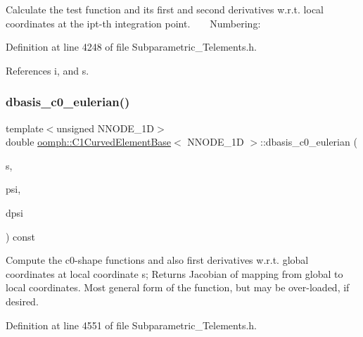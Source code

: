 Calculate the test function and its first and second derivatives w.\+r.\+t. local coordinates at the ipt-\/th integration point. ~\newline
~\newline
 Numbering\+: 

Definition at line 4248 of file Subparametric\+\_\+\+Telements.\+h.



References i, and s.

\mbox{\label{classoomph_1_1C1CurvedElementBase_a48932300808586ba1773a54a6ed768e4}} 
\subsubsection{\texorpdfstring{dbasis\+\_\+c0\+\_\+eulerian()}{dbasis\_c0\_eulerian()}}
{\footnotesize\ttfamily template$<$unsigned N\+N\+O\+D\+E\+\_\+1D$>$ \\
double \hyperlink{classoomph_1_1C1CurvedElementBase}{oomph\+::\+C1\+Curved\+Element\+Base}$<$ N\+N\+O\+D\+E\+\_\+1D $>$\+::dbasis\+\_\+c0\+\_\+eulerian (\begin{DoxyParamCaption}\item[{const \hyperlink{classoomph_1_1Vector}{Vector}$<$ double $>$ \&}]{s,  }\item[{\hyperlink{classoomph_1_1Shape}{Shape} \&}]{psi,  }\item[{\hyperlink{classoomph_1_1DShape}{D\+Shape} \&}]{dpsi }\end{DoxyParamCaption}) const\hspace{0.3cm}{\ttfamily [inline]}}



Compute the c0-\/shape functions and also first derivatives w.\+r.\+t. global coordinates at local coordinate s; Returns Jacobian of mapping from global to local coordinates. Most general form of the function, but may be over-\/loaded, if desired. 



Definition at line 4551 of file Subparametric\+\_\+\+Telements.\+h.

\mbox{\label{classoomph_1_1C1CurvedElementBase_aea6eaf2184fb2ebe373b10e0e700caf3}} 

